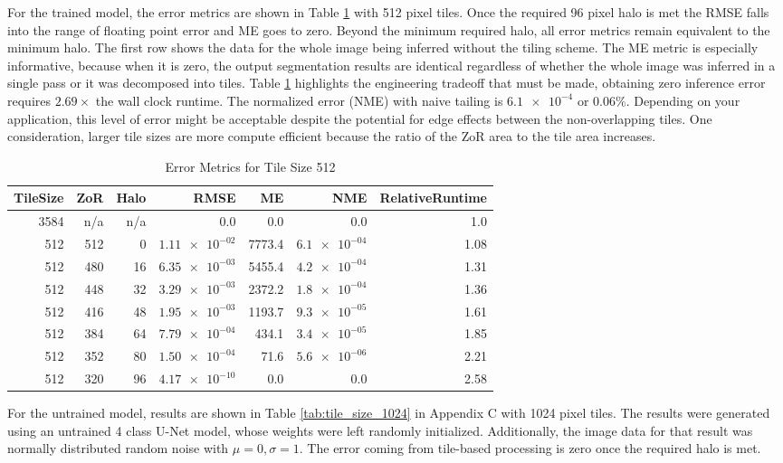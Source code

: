 \documentclass[runningheads]{llncs}
\begin{document}
For the trained model, the error metrics are shown in Table \ref{tab:tile_size_512} with 512 pixel tiles. Once the required 96 pixel halo is met the RMSE falls into the range of floating point error and ME goes to zero. Beyond the minimum required halo, all error metrics remain equivalent to the minimum halo. The first row shows the data for the whole image being inferred without the tiling scheme. 
The ME metric is especially informative, because when it is zero, the output segmentation results are identical regardless of whether the whole image was inferred in a single pass or it was decomposed into tiles. Table \ref{tab:tile_size_512} highlights the engineering tradeoff that must be made, obtaining zero inference error requires $2.69 \times$ the wall clock runtime. The normalized error (NME) with naive tailing is $\num{6.1e-4}$ or $\num{0.06} \%$. Depending on your application, this level of error might be acceptable despite the potential for edge effects between the non-overlapping tiles. One consideration, larger tile sizes are more compute efficient because the ratio of the ZoR area to the tile area increases. 

\begin{table}[h!]
	\centering
\caption{Error Metrics for Tile Size 512}
\label{tab:tile_size_512}
\begin{tabular}{r|r|r|r|r|r|r}
	TileSize & ZoR & Halo & RMSE    & ME & NME & RelativeRuntime \\ 
	\hline
3584 & n/a & n/a & 0.0 & 0.0 & 0.0 & 1.0 \\
512 & 512 & 0 & $\num{1.11e-02}$ & 7773.4 & $\num{6.1e-04}$ & 1.08 \\
512 & 480 & 16 & $\num{6.35e-03}$ & 5455.4 & $\num{4.2e-04}$ & 1.31 \\
512 & 448 & 32 & $\num{3.29e-03}$ & 2372.2 & $\num{1.8e-04}$ & 1.36 \\
512 & 416 & 48 & $\num{1.95e-03}$ & 1193.7 & $\num{9.3e-05}$ & 1.61 \\
512 & 384 & 64 & $\num{7.79e-04}$ & 434.1 & $\num{3.4e-05}$ & 1.85 \\
512 & 352 & 80 & $\num{1.50e-04}$ & 71.6 & $\num{5.6e-06}$ & 2.21 \\
512 & 320 & 96 & $\num{4.17e-10}$ & 0.0 & 0.0 & 2.58 \\
\end{tabular}
\end{table}

For the untrained model, results are shown in Table \ref{tab:tile_size_1024} in Appendix C with 1024 pixel tiles. The results were generated using an untrained 4 class U-Net model, whose weights were left randomly initialized. Additionally, the image data for that result was normally distributed random noise with $\mu = 0, \sigma = 1$. The error coming from tile-based processing is zero once the required halo is met.
\end{document}
